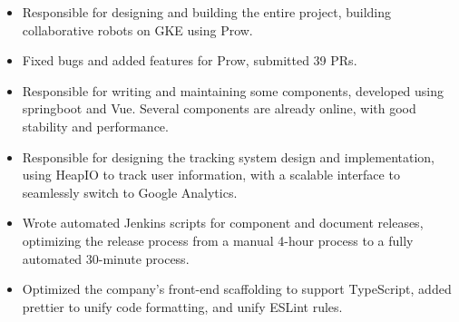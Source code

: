 \documentclass{resume}
\newcommand{\en}[1]{#1}
\newcommand{\zh}[1]{}
\begin{document}
\en{}
\zh{\role{社区前后端开发工程师}{\href{https://github.com/ti-community-infra/tichi}{TiChi} 研发}}
\begin{itemize}
      \item \en{Responsible for designing and building the entire project, building collaborative robots on GKE using Prow.}
            \zh{负责设计和构建整个项目，使用 Prow 在 GKE 上搭建协作机器人。}
      \item \en{Fixed bugs and added features for Prow, submitted 39 PRs.}
            \zh{为 Prow 修复 bug 和添加功能，提交了 39 个 PR。}
\end{itemize}

\en{}
\zh{\datedsubsection{\textbf{\href{https://www.morningstar.com/}{晨星资讯（Morningstar, Inc. ）}}}{2019/06 -- 2020/07}}
\en{}
\zh{\role{前后端开发工程师}{组件开发}}
\begin{itemize}
      \item \en{Responsible for writing and maintaining some components, developed using springboot and Vue. Several components are already online, with good stability and performance.}
            \zh{负责独立组件的编写和维护，使用 springboot 和 Vue 开发。多个组件已经上线使用，有较好的稳定性和性能。}
      \item \en{Responsible for designing the tracking system design and implementation, using HeapIO to track user information, with a scalable interface to seamlessly switch to Google Analytics.}
            \zh{负责设计和实现前端 tracking 系统，使用 HeapIO 追踪用户信息，并预留可扩展接口，可无缝切换至 Google Analytics。}
      \item \en{Wrote automated Jenkins scripts for component and document releases, optimizing the release process from a manual 4-hour process to a fully automated 30-minute process.}
            \zh{为组件和文档发布编写了自动化 Jenkins 脚本，将发布流程从手动 4 小时优化到全自动 30 分钟。}
      \item \en{Optimized the company's front-end scaffolding to support TypeScript, added prettier to unify code formatting, and unify ESLint rules.}
            \zh{优化公司前端脚手架，使其支持 TypeScript，添加 prettier 统一代码格式，优化统一 ESLint 规则。}
\end{itemize}
\end{document}
